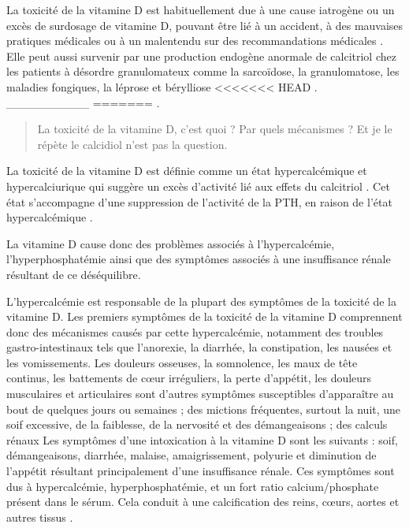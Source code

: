 \documentclass[
  a4paper,
  DIV=11,
  numbers=noendperiod,
  listof=totoc]{scrreprt}
\begin{document}
La toxicité de la vitamine D est habituellement due à une cause
iatrogène ou un excès de surdosage de vitamine D, pouvant être lié à un
accident, à des mauvaises pratiques médicales ou à un malentendu sur des
recommandations médicales \autocite{Lim.2020vd}. Elle peut aussi
survenir par une production endogène anormale de calcitriol chez les
patients à désordre granulomateux comme la sarcoïdose, la granulomatose,
les maladies fongiques, la léprose et bérylliose
<<<<<<< HEAD
\autocite{Marcinowska-Suchowierska.2018}. \_\_\_\_\_\_\_\_\_\_
=======
\autocite{Marcinowska-Suchowierska.2018}.

\begin{quote}
La toxicité de la vitamine D, c'est quoi ? Par quels mécanismes ? Et je
le répète le calcidiol n'est pas la question.
\end{quote}

La toxicité de la vitamine D est définie comme un état hypercalcémique
et hypercalciurique qui suggère un excès d'activité lié aux effets du
calcitriol \autocite{Vieth.1990}. Cet état s'accompagne d'une
suppression de l'activité de la \ac{PTH}, en raison de l'état
hypercalcémique \autocite{Marcinowska-Suchowierska.2018}.

La vitamine D cause donc des problèmes associés à l'hypercalcémie,
l'hyperphosphatémie ainsi que des symptômes associés à une insuffisance
rénale résultant de ce déséquilibre.

L'hypercalcémie est responsable de la plupart des symptômes de la
toxicité de la vitamine D. Les premiers symptômes de la toxicité de la
vitamine D comprennent donc des mécanismes causés par cette
hypercalcémie, notamment des troubles gastro-intestinaux tels que
l'anorexie, la diarrhée, la constipation, les nausées et les
vomissements. Les douleurs osseuses, la somnolence, les maux de tête
continus, les battements de cœur irréguliers, la perte d'appétit, les
douleurs musculaires et articulaires sont d'autres symptômes
susceptibles d'apparaître au bout de quelques jours ou semaines ; des
mictions fréquentes, surtout la nuit, une soif excessive, de la
faiblesse, de la nervosité et des démangeaisons ; des calculs rénaux
\autocite{Alshahrani.2013} Les symptômes d'une intoxication à la
vitamine D sont les suivants : soif, démangeaisons, diarrhée, malaise,
amaigrissement, polyurie et diminution de l'appétit résultant
principalement d'une insuffisance rénale. Ces symptômes sont dus à
hypercalcémie, hyperphosphatémie, et un fort ratio calcium/phosphate
présent dans le sérum. Cela conduit à une calcification des reins,
cœurs, aortes et autres tissus \autocite{DeLuca.2011}.
\end{document}
